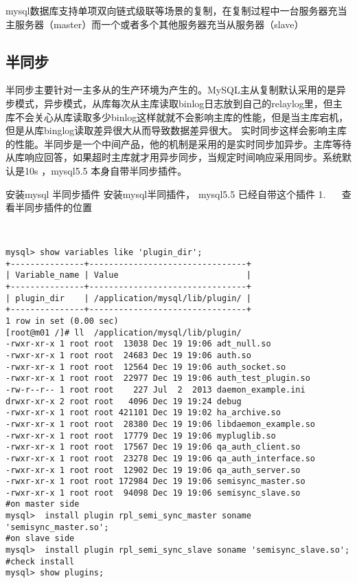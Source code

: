 mysql数据库支持单项双向链式级联等场景的复制，在复制过程中一台服务器充当主服务器（master）而一个或者多个其他服务器充当从服务器（slave）

\subsection{半同步}
半同步主要针对一主多从的生产环境为产生的。MySQL主从复制默认采用的是异步模式，异步模式，从库每次从主库读取binlog日志放到自己的relaylog里，但主库不会关心从库读取多少binlog这样就就不会影响主库的性能，但是当主库宕机，但是从库binglog读取差异很大从而导致数据差异很大。
实时同步这样会影响主库的性能。半同步是一个中间产品，他的机制是采用的是实时同步加异步。主库等待从库响应回答，如果超时主库就才用异步同步，当规定时间响应采用同步。系统默认是10s ，mysql5.5 本身自带半同步插件。

安装mysql 半同步插件
安装mysql半同插件， mysql5.5 已经自带这个插件
1.    查看半同步插件的位置
\begin{lstlisting}
	

mysql> show variables like 'plugin_dir';
+---------------+--------------------------------+
| Variable_name | Value                          | 
+---------------+--------------------------------+
| plugin_dir    | /application/mysql/lib/plugin/ | 
+---------------+--------------------------------+
1 row in set (0.00 sec)
[root@m01 /]# ll  /application/mysql/lib/plugin/ 
-rwxr-xr-x 1 root root  13038 Dec 19 19:06 adt_null.so 
-rwxr-xr-x 1 root root  24683 Dec 19 19:06 auth.so 
-rwxr-xr-x 1 root root  12564 Dec 19 19:06 auth_socket.so 
-rwxr-xr-x 1 root root  22977 Dec 19 19:06 auth_test_plugin.so 
-rw-r--r-- 1 root root    227 Jul  2  2013 daemon_example.ini 
drwxr-xr-x 2 root root   4096 Dec 19 19:24 debug 
-rwxr-xr-x 1 root root 421101 Dec 19 19:02 ha_archive.so
-rwxr-xr-x 1 root root  28380 Dec 19 19:06 libdaemon_example.so 
-rwxr-xr-x 1 root root  17779 Dec 19 19:06 mypluglib.so 
-rwxr-xr-x 1 root root  17567 Dec 19 19:06 qa_auth_client.so 
-rwxr-xr-x 1 root root  23278 Dec 19 19:06 qa_auth_interface.so 
-rwxr-xr-x 1 root root  12902 Dec 19 19:06 qa_auth_server.so 
-rwxr-xr-x 1 root root 172984 Dec 19 19:06 semisync_master.so
-rwxr-xr-x 1 root root  94098 Dec 19 19:06 semisync_slave.so 
#on master side
mysql>  install plugin rpl_semi_sync_master soname 'semisync_master.so';
#on slave side
mysql>  install plugin rpl_semi_sync_slave soname 'semisync_slave.so';
#check install
mysql> show plugins;
\end{lstlisting}

